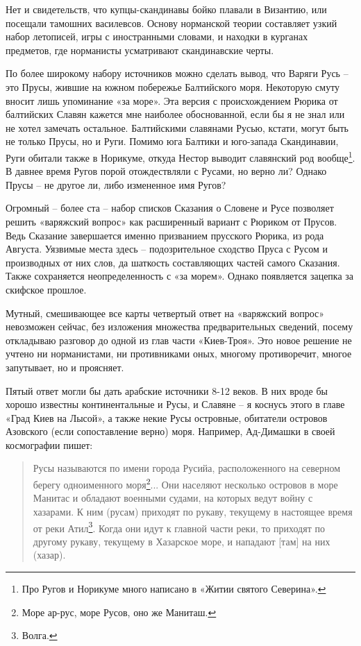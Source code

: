 Нет и свидетельств, что купцы-скандинавы бойко плавали в Византию, или посещали тамошних василевсов. Основу норманской теории составляет узкий набор летописей, игры с иностранными словами, и находки в курганах предметов, где норманисты усматривают скандинавские черты.

По более широкому набору источников можно сделать вывод, что Варяги Русь – это Прусы, жившие на южном побережье Балтийского моря. Некоторую смуту вносит лишь упоминание «за море». Эта версия с происхождением Рюрика от балтийских Славян кажется мне наиболее обоснованной, если бы я не знал или не хотел замечать остальное. Балтийскими славянами Русью, кстати, могут быть не только Прусы, но и Руги. Помимо юга Балтики и юго-запада Скандинавии, Руги обитали также в Норикуме, откуда Нестор выводит славянский род вообще\footnote{Про Ругов и Норикуме много написано в «Житии святого Северина».}. В давнее время Ругов порой отождествляли с Русами, но верно ли? Однако Прусы – не другое ли, либо измененное имя Ругов?

Огромный – более ста – набор списков Сказания о Словене и Русе позволяет решить «варяжский вопрос» как расширенный вариант с Рюриком от Прусов. Ведь Сказание завершается именно призванием прусского Рюрика, из рода Августа. Уязвимые места здесь – подозрительное сходство Пруса с Русом и производных от них слов, да шаткость составляющих частей самого Сказания. Также сохраняется неопределенность с «за морем». Однако появляется зацепка за скифское прошлое.

Мутный, смешивающее все карты четвертый ответ на «варяжский вопрос» невозможен сейчас, без изложения множества предварительных сведений, посему откладываю разговор до одной из глав части «Киев-Троя». Это новое решение не учтено ни норманистами, ни противниками оных, многому противоречит, многое запутывает, но и проясняет.

Пятый ответ могли бы дать арабские источники 8-12 веков. В них вроде бы хорошо известны континентальные и Русы, и Славяне – я коснусь этого в главе «Град Киев на Лысой», а также некие Русы островные, обитатели островов Азовского (если сопоставление верно) моря. Например, Ад-Димашки в своей космографии пишет\cite{konovalova01}:

\begin{quotation}
Русы называются по имени города Русийа, расположенного на северном берегу одноименного моря\footnote{Море ар-рус, море Русов, оно же Маниташ.}... Они населяют несколько островов в море Манитас и обладают военными судами, на которых ведут войну с хазарами. К ним (русам) приходят по рукаву, текущему в настоящее время от реки Атил\footnote{Волга.}. Когда они идут к главной части реки, то приходят по другому рукаву, текущему в Хазарское море, и нападают [там] на них (хазар).
\end{quotation}

